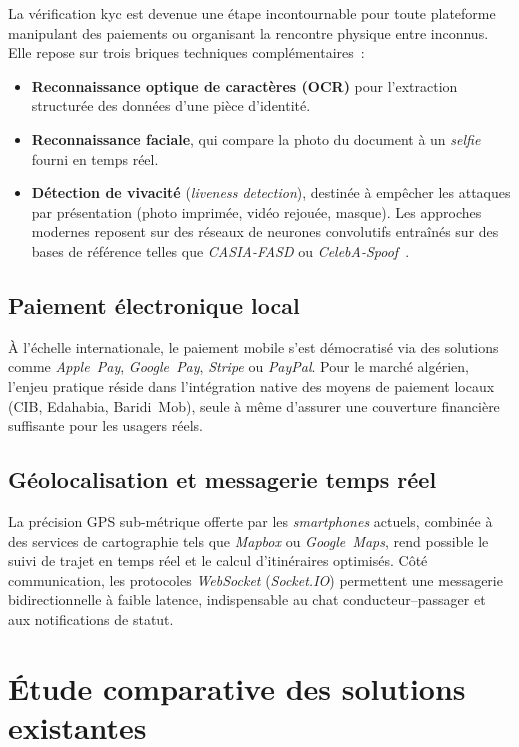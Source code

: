 La vérification \gls{kyc} est devenue une étape incontournable pour toute plateforme manipulant des paiements ou organisant la rencontre physique entre inconnus. Elle repose sur trois briques techniques complémentaires~:
\begin{itemize}
  \item \textbf{Reconnaissance optique de caractères (OCR)} pour l'extraction structurée des données d'une pièce d'identité.
  \item \textbf{Reconnaissance faciale}, qui compare la photo du document à un \textit{selfie} fourni en temps réel.
  \item \textbf{Détection de vivacité} (\textit{liveness detection}), destinée à empêcher les attaques par présentation (photo imprimée, vidéo rejouée, masque). Les approches modernes reposent sur des réseaux de neurones convolutifs entraînés sur des bases de référence telles que \textit{CASIA-FASD} ou \textit{CelebA-Spoof}~\cite{boulkenafet_liveness_2017}.
\end{itemize}

\subsection{Paiement électronique local}

À l'échelle internationale, le paiement mobile s'est démocratisé via des solutions comme \textit{Apple~Pay}, \textit{Google~Pay}, \textit{Stripe} ou \textit{PayPal}. Pour le marché algérien, l'enjeu pratique réside dans l'intégration native des moyens de paiement locaux (CIB, Edahabia, Baridi~Mob), seule à même d'assurer une couverture financière suffisante pour les usagers réels.

\subsection{Géolocalisation et messagerie temps réel}

La précision GPS sub-métrique offerte par les \textit{smartphones} actuels, combinée à des services de cartographie tels que \textit{Mapbox} ou \textit{Google~Maps}, rend possible le suivi de trajet en temps réel et le calcul d'itinéraires optimisés. Côté communication, les protocoles \textit{WebSocket} (\textit{Socket.IO}) permettent une messagerie bidirectionnelle à faible latence, indispensable au chat conducteur--passager et aux notifications de statut.

\section{Étude comparative des solutions existantes}
\label{sec:comparatif}

